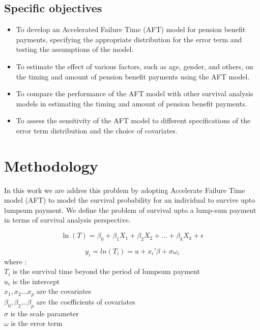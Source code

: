 \documentclass[twoside,a4paper,12pt]{article}
\begin{document}
\subsection*{Specific objectives}
\begin{itemize}
	\item To develop an Accelerated Failure Time (AFT) model for pension benefit payments, specifying the appropriate distribution for the error term and testing the assumptions of the model.
	\item To estimate the effect of various factors, such as age, gender, and others, on the timing and amount of pension benefit payments using the AFT model.
	\item  To compare the performance of the AFT model with other survival analysis models  in estimating the timing and amount of pension benefit payments.
	\item To assess the sensitivity of the AFT model to different specifications of the error term distribution and the choice of covariates.
	
	
	
\end{itemize}

\section*{Methodology} In this work we are addres this problem by adopting Accelerate Failure Time model (AFT) to model the survival probability for an individual to survive upto lumpsum payment. We define the problem of survival upto a lump-sum payment in terms of survival analysis perspective.  








\begin{equation}	
		\ln(T) = \beta_0 + \beta_1 X_1 + \beta_2 X_2 + \dots + \beta_k X_k + \epsilon \label{eq:1} 	
\end{equation}


\begin{equation}
y_i=ln(T_i)=u+x_i'\beta+\sigma \omega_i
\end{equation}
where :\\
$T_i$ 	is the survival time beyond the period of lumpsum payment\\
$u_i$ 	is the intercept\\
$x_1,x_2 \dots x_p$	 are the covariates\\
$\beta_0,\beta_2 \dots \beta_p$ 	are the coefficients of covariates\\
$\sigma$ 	is the scale parameter\\
$\omega$	 is the error term
\end{document}
